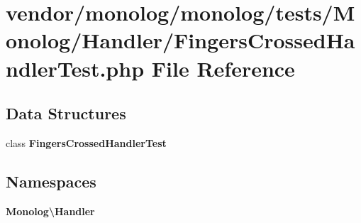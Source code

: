 \section{vendor/monolog/monolog/tests/\+Monolog/\+Handler/\+Fingers\+Crossed\+Handler\+Test.php File Reference}
\label{_fingers_crossed_handler_test_8php}
\subsection*{Data Structures}
\begin{DoxyCompactItemize}
\item 
class {\bf Fingers\+Crossed\+Handler\+Test}
\end{DoxyCompactItemize}
\subsection*{Namespaces}
\begin{DoxyCompactItemize}
\item 
 {\bf Monolog\textbackslash{}\+Handler}
\end{DoxyCompactItemize}
